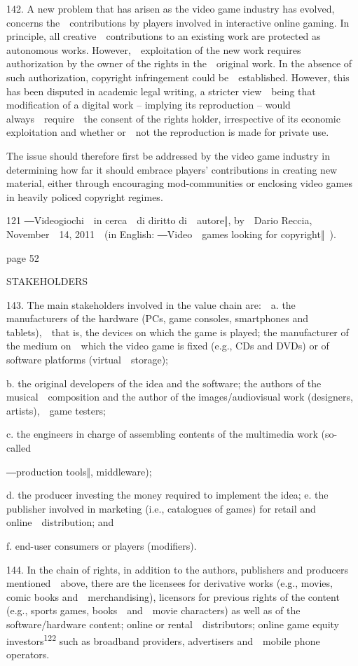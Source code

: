\documentclass[
]{article}
\begin{document}
{142. }{A new problem that has arisen as the video game industry has
evolved, concerns the~~contributions by players involved in interactive
online gaming. In principle, all creative~~contributions to an existing
work are protected as autonomous works. However,~~exploitation of the
new work requires authorization by the owner of the rights in
the~~original work. In the absence of such authorization, copyright
infringement could be~~established. However, this has been disputed in
academic legal writing, a stricter view~~being that modification of a
digital work }{-- }{implying its reproduction }{-- }{would
always~~require~~the consent of the rights holder, irrespective of its
economic exploitation and whether or~~not the reproduction is made for
private use.}

{The issue should therefore first be addressed by the video game
industry in determining }{how far it should embrace players'
contributions }{in creating new material, either through encouraging
mod-communities or enclosing video games in heavily policed copyright
regimes.}

{121 }{―}{Videogiochi~~in cerca~~di diritto di~~autore}{‖}{, by~~Dario
Reccia, November~~14, 2011~~(}{in English: ―}{Video~~games looking for
copyright}{‖}{~).}

{page 52}

{STAKEHOLDERS}

{143. }{The main stakeholders involved in the value chain are:~~a. the
manufacturers of the hardware (PCs, game consoles, smartphones and
tablets),~~that is, the devices on which the game is played; the
manufacturer of the medium on~~which the video game is fixed (e.g., CDs
and DVDs) or of software platforms (virtual~~storage);}

{b. the original developers of the idea and the software; the authors of
the musical~~composition and the author of the images/audiovisual work
(designers, artists),~~game testers;}

{c. the engineers in charge of assembling contents of the multimedia
work (so-called}

{―production tools‖, middleware);}

{d. the producer investing the money required to implement the idea; e.
the publisher involved in marketing (i.e., catalogues of games) for
retail and online~~distribution; and}

{f. end-user consumers or players (modifiers).}

{144. }{In the chain of rights, in addition to the authors, publishers
and producers mentioned~~above, there are the licensees for derivative
works (e.g., movies, comic books and~~merchandising), licensors for
previous rights of the content (e.g., sports games, books~~and~~movie
characters) as well as of the software/hardware content; online or
rental~~distributors; online game equity investors}\textsuperscript{{122
}}{such as broadband providers, advertisers and~~mobile phone
operators.}
\end{document}
